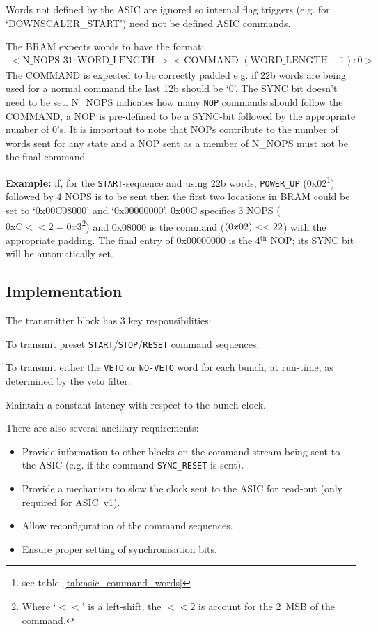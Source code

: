 Words not defined by the ASIC are ignored so internal flag triggers (e.g. for `DOWNSCALER\_START') need not be defined ASIC commands.

The BRAM expects words to have the format:
\begin{align}\label{fmt:tx_bram}
  <\text{N\_NOPS } 31:\text{WORD\_LENGTH }><\text{COMMAND } (\text{WORD\_LENGTH} - 1):0>
\end{align}
The COMMAND is expected to be correctly padded e.g. if 22b words are being used for a normal command the last 12b should be `0'. The SYNC bit doesn't need to be set. N\_NOPS indicates how many \texttt{NOP} commands should follow the COMMAND, a NOP is pre-defined to be a SYNC-bit followed by the appropriate number of 0's. It is important to note that NOPs contribute to the number of words sent for any state and a NOP sent as a member of N\_NOPS must not be the final command

\textbf{Example:} if, for the \texttt{START}-sequence and using 22b words, \texttt{POWER\_UP} (0x02\footnote{see table~\ref{tab:asic_command_words}}) followed by 4 NOPS is to be sent then the first two locations in BRAM could be set to `0x00C08000' and `0x00000000'. 0x00C specifies 3 NOPS (\(\text{0xC}<<2 = 0x3\)\footnote{Where `\(<<\)' is a left-shift, the \( <<2 \) is account for the 2~MSB of the command.}) and 0x08000 is the command (\(\text(0x02) << 22 \)) with the appropriate padding. The final entry of 0x00000000 is the 4\(^{\text{th}}\) NOP; its SYNC bit will be automatically set.
\subsection{Implementation} %
\label{sub:tx_implementation}
    
The transmitter block has 3 key responsibilities:
\begin{itemize*}
  \item To transmit preset \texttt{START}/\texttt{STOP}/\texttt{RESET} command sequences. 
  \item To transmit either the \texttt{VETO} or \texttt{NO-VETO} word for each bunch, at run-time, as determined by the veto filter.
  \item Maintain a constant latency with respect to the bunch clock. 
\end{itemize*}
There are also several ancillary requirements:
\begin{itemize}
  \item Provide information to other blocks on the command stream being sent to the ASIC (e.g. if the command \texttt{SYNC\_RESET} is sent).
  \item Provide a mechanism to slow the clock sent to the ASIC for read-out (only required for ASIC~v1).
  \item Allow reconfiguration of the command sequences.
  \item Ensure proper setting of synchronisation bits.
\end{itemize}
    
